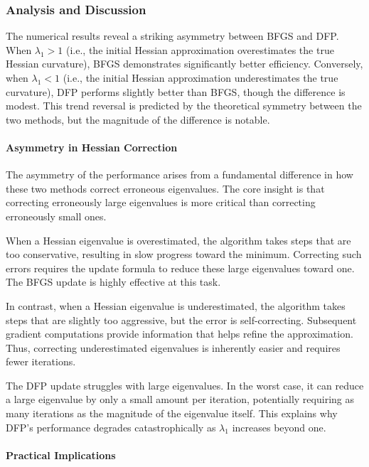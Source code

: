 \documentclass[0_en]{subfiles}
\begin{document}
\subsubsection{Analysis and Discussion}

The numerical results reveal a striking asymmetry between BFGS and DFP.
When $\lambda_1 > 1$ (i.e., the initial Hessian approximation overestimates the true Hessian curvature), BFGS demonstrates significantly better efficiency.
Conversely, when $\lambda_1 < 1$ (i.e., the initial Hessian approximation underestimates the true curvature), DFP performs slightly better than BFGS, though the difference is modest.
This trend reversal is predicted by the theoretical symmetry between the two methods, but the magnitude of the difference is notable.

\paragraph{Asymmetry in Hessian Correction}

The asymmetry of the performance arises from a fundamental difference in how these two methods correct erroneous eigenvalues.
The core insight is that correcting erroneously large eigenvalues is more critical than correcting erroneously small ones.

When a Hessian eigenvalue is overestimated, the algorithm takes steps that are too conservative, resulting in slow progress toward the minimum. Correcting such errors requires the update formula to reduce these large eigenvalues toward one.
The BFGS update is highly effective at this task.

In contrast, when a Hessian eigenvalue is underestimated, the algorithm takes steps that are slightly too aggressive, but the error is self-correcting.
Subsequent gradient computations provide information that helps refine the approximation.
Thus, correcting underestimated eigenvalues is inherently easier and requires fewer iterations.

The DFP update struggles with large eigenvalues.
In the worst case, it can reduce a large eigenvalue by only a small amount per iteration, potentially requiring as many iterations as the magnitude of the eigenvalue itself.
This explains why DFP's performance degrades catastrophically as $\lambda_1$ increases beyond one.

\paragraph{Practical Implications}
\end{document}
